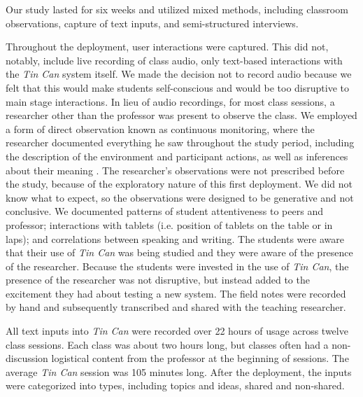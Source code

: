 Our study lasted for six weeks and utilized mixed methods, including classroom observations, capture of text inputs, and semi-structured interviews.

Throughout the deployment, user interactions were captured. This did not, notably, include live recording of class audio, only text-based interactions with the \emph{Tin Can} system itself. We made the decision not to record audio because we felt that this would make students self-conscious and would be too disruptive to main stage interactions.  In lieu of audio recordings, for most class sessions, a researcher other than the professor was present to observe the class. We employed a form of direct observation known as continuous monitoring, where the researcher documented everything he saw throughout the study period, including the description of the environment and participant actions, as well as inferences about their meaning \citep{interpersonal_interaction}. The researcher's observations were not prescribed before the study, because of the exploratory nature of this first deployment. We did not know what to expect, so the observations were designed to be generative and not conclusive.  We documented patterns of student attentiveness to peers and professor; interactions with tablets (i.e. position of tablets on the table or in laps); and correlations between speaking and writing. The students were aware that their use of \emph{Tin Can} was being studied and they were aware of the presence of the researcher. Because the students were invested in the use of \emph{Tin Can}, the presence of the researcher was not disruptive, but instead added to the excitement they had about testing a new system.  The field notes were recorded by hand and subsequently transcribed and shared with the teaching researcher. 

All text inputs into \emph{Tin Can} were recorded over 22 hours of usage across twelve class sessions.  Each class was about two hours long, but classes often had a non-discussion logistical content from the professor at the beginning of sessions. The average \emph{Tin Can} session was 105 minutes long. After the deployment, the inputs were categorized into types, including topics and ideas, shared and non-shared.

